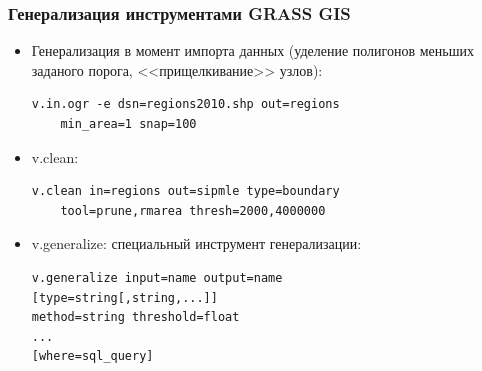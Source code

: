 \begin{frame}[fragile]
    \frametitle{Генерализация инструментами GRASS GIS}
    \begin{itemize}
        \item Генерализация в момент импорта данных (уделение полигонов меньших заданого порога, <<прищелкивание>> узлов):
\begin{verbatim}
v.in.ogr -e dsn=regions2010.shp out=regions
    min_area=1 snap=100
\end{verbatim}


        \item v.clean:
\begin{verbatim}
v.clean in=regions out=sipmle type=boundary
    tool=prune,rmarea thresh=2000,4000000
\end{verbatim}
        \item v.generalize: специальный инструмент генерализации:
\begin{verbatim}
v.generalize input=name output=name
[type=string[,string,...]]
method=string threshold=float
...
[where=sql_query]
\end{verbatim}
    \end{itemize}
\end{frame}


